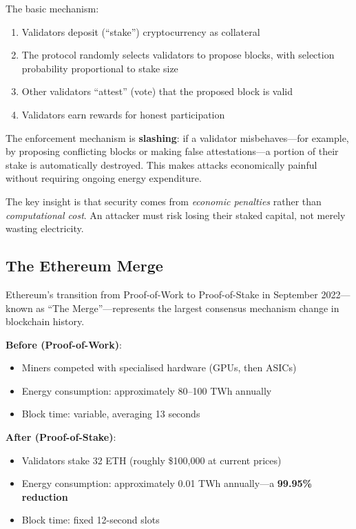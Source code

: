 \documentclass[11pt,a4paper]{article}
\newcommand{\keyword}[1]{\textbf{\textcolor{AccentOrange}{#1}}}
\begin{document}
The basic mechanism:
\begin{enumerate}
    \item Validators deposit (``stake'') cryptocurrency as collateral
    \item The protocol randomly selects validators to propose blocks, with selection probability proportional to stake size
    \item Other validators ``attest'' (vote) that the proposed block is valid
    \item Validators earn rewards for honest participation
\end{enumerate}

The enforcement mechanism is \keyword{slashing}: if a validator misbehaves---for example, by proposing conflicting blocks or making false attestations---a portion of their stake is automatically destroyed. This makes attacks economically painful without requiring ongoing energy expenditure.

The key insight is that security comes from \textit{economic penalties} rather than \textit{computational cost}. An attacker must risk losing their staked capital, not merely wasting electricity.

\subsection{The Ethereum Merge}

Ethereum's transition from Proof-of-Work to Proof-of-Stake in September 2022---known as ``The Merge''---represents the largest consensus mechanism change in blockchain history.

\textbf{Before (Proof-of-Work)}:
\begin{itemize}
    \item Miners competed with specialised hardware (GPUs, then ASICs)
    \item Energy consumption: approximately 80--100 TWh annually
    \item Block time: variable, averaging 13 seconds
\end{itemize}

\textbf{After (Proof-of-Stake)}:
\begin{itemize}
    \item Validators stake 32 ETH (roughly \$100,000 at current prices)
    \item Energy consumption: approximately 0.01 TWh annually---a \textbf{99.95\% reduction}
    \item Block time: fixed 12-second slots
\end{itemize}
\end{document}
